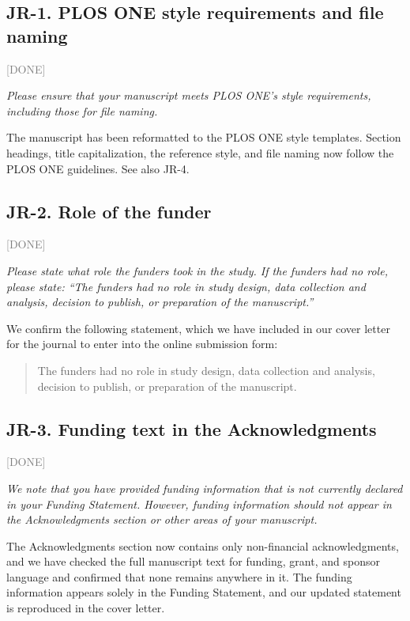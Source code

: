 \documentclass[11pt]{article}
\newcommand{\status}[1]{\textcolor{gray}{\small\textsf{[#1]}}}
\newenvironment{rev}{\begin{leftbar}\itshape\small}{\end{leftbar}}
\begin{document}
\subsection{JR-1. PLOS ONE style requirements and file naming} \status{DONE}

\begin{rev}
Please ensure that your manuscript meets PLOS ONE's style requirements, including those
for file naming.
\end{rev}

\noindent The manuscript has been reformatted to the PLOS ONE style templates. Section
headings, title capitalization, the reference style, and file naming now follow the PLOS
ONE guidelines. See also JR-4.

\subsection{JR-2. Role of the funder} \status{DONE}

\begin{rev}
Please state what role the funders took in the study. If the funders had no role, please
state: ``The funders had no role in study design, data collection and analysis, decision
to publish, or preparation of the manuscript.''
\end{rev}

\noindent We confirm the following statement, which we have included in our cover letter
for the journal to enter into the online submission form:

\begin{quote}
The funders had no role in study design, data collection and analysis, decision to
publish, or preparation of the manuscript.
\end{quote}



\subsection{JR-3. Funding text in the Acknowledgments} \status{DONE}

\begin{rev}
We note that you have provided funding information that is not currently declared in your
Funding Statement. However, funding information should not appear in the Acknowledgments
section or other areas of your manuscript.
\end{rev}

\noindent The Acknowledgments section now contains only non-financial acknowledgments, and
we have checked the full manuscript text for funding, grant, and sponsor language and
confirmed that none remains anywhere in it. The funding information appears solely in the
Funding Statement, and our updated statement is reproduced in the cover letter.
\end{document}

